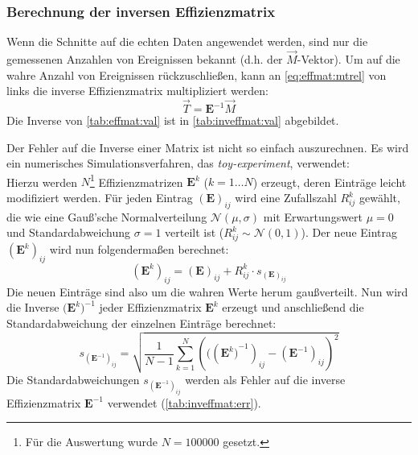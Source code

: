 \subsubsection{Berechnung der inversen Effizienzmatrix}
Wenn die Schnitte auf die echten Daten angewendet werden, sind nur die gemessenen Anzahlen von Ereignissen bekannt
(d.h. der $\vec{M}$-Vektor). Um auf die wahre Anzahl von Ereignissen rückzuschließen, kann an \autoref{eq:effmat:mtrel}
von links die inverse Effizienzmatrix multipliziert werden:
\begin{equation}
    \vec{T} = \bm{E}^{-1} \vec{M}
\end{equation}
Die Inverse von \autoref{tab:effmat:val} ist in \autoref{tab:inveffmat:val} abgebildet.

Der Fehler auf die Inverse einer Matrix ist nicht so einfach auszurechnen. Es wird ein numerisches Simulationsverfahren,
das \emph{toy-experiment}, verwendet: \\
Hierzu werden $N$\footnote{Für die Auswertung wurde $N=100000$ gesetzt.} Effizienzmatrizen $\bm{E}^k$ ($k=1 \ldots N$) erzeugt,
deren Einträge leicht modifiziert werden. Für jeden Eintrag $(\bm{E})_{ij}$ wird eine Zufallszahl $R_{ij}^k$
gewählt, die wie eine Gauß'sche Normalverteilung $\mathcal{N}(\mu, \sigma)$ mit Erwartungswert $\mu = 0$ und
Standardabweichung $\sigma = 1$ verteilt ist ($R_{ij}^k \sim \mathcal{N}(0, 1)$). Der neue Eintrag $(\bm{E}^k)_{ij}$ wird nun folgendermaßen berechnet:
\begin{equation}
    (\bm{E}^k)_{ij} = (\bm{E})_{ij} + R_{ij}^k \cdot s_{(\bm{E})_{ij}}
\end{equation}
Die neuen Einträge sind also um die wahren Werte herum gaußverteilt. Nun wird die Inverse ${(\bm{E}^k})^{-1}$ jeder
Effizienzmatrix $\bm{E}^k$ erzeugt und
anschließend die Standardabweichung der einzelnen Einträge berechnet:
\begin{equation}
    s_{(\bm{E}^{-1})_{ij}} = \sqrt{\frac{1}{N-1} \sum_{k=1}^{N} \left((({\bm{E}^k)}^{-1})_{ij} - (\bm{E}^{-1})_{ij} \right)^2 }
\end{equation}
Die Standardabweichungen $s_{(\bm{E}^{-1})_{ij}}$ werden als Fehler auf die inverse Effizienzmatrix $\bm{E}^{-1}$ verwendet
(\autoref{tab:inveffmat:err}).

